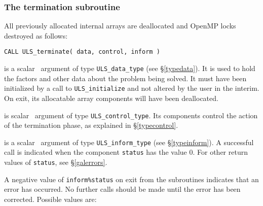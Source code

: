 \documentclass{galahad}
\newcommand{\packagename}{ULS}
\begin{document}

\subsubsection{The termination subroutine}
All previously allocated internal arrays are deallocated and OpenMP locks
destroyed as follows:

\hskip0.5in
{\tt CALL \packagename\_terminate( data, control, inform )}

\begin{description}

 is a scalar \intentinout\ argument of type
{\tt \packagename\_data\_type}
(see \S\ref{typedata}). It is used to hold the factors and other
data about the problem being solved.
It must have been initialized by a call to
{\tt \packagename\_ini\-tialize} and not altered by the user in the interim.
On exit, its allocatable array components will have been deallocated.

 is scalar \intentin\ argument of type
{\tt \packagename\_control\_type}. Its components control the action
of the termination phase, as explained in
\S\ref{typecontrol}.

 is a scalar \intentinout\ argument of type
{\tt \packagename\_inform\_type}
(see \S\ref{typeinform}).
A successful call is indicated when the  component {\tt status} has the value 0.
For other return values of {\tt status}, see \S\ref{galerrors}.

\end{description}


\galerrors
A negative value of {\tt inform\%status} on exit from the subroutines
indicates that an error has occurred. No further calls should be made
until the error has been corrected. Possible values are:
\end{document}
